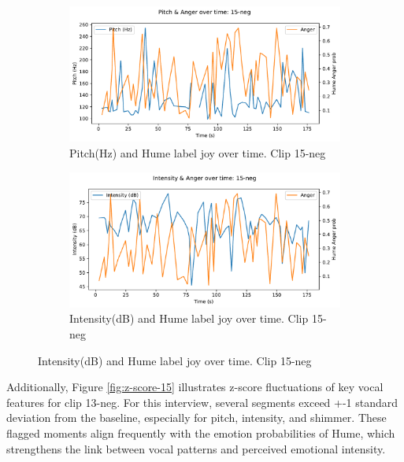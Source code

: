 \begin{figure}[H]
    \centering
    \begin{subfigure}[b]{0.47\textwidth}
        \includegraphics[width=\linewidth]{png/results/rq1/pitch_anger_15-neg.pdf}
        \caption{Pitch(Hz) and Hume label joy over time. Clip 15-neg}
        \label{fig:pitch-15-neg}
    \end{subfigure}
    \hspace{0.04\textwidth}
    \begin{subfigure}[b]{0.47\textwidth}
        \includegraphics[width=\linewidth]{png/results/rq1/intensity_anger_15-neg.pdf}
        \caption{Intensity(dB) and Hume label joy over time. Clip 15-neg}
        \label{fig:intensity-15-neg}
    \end{subfigure}
\end{figure}

Additionally, Figure \ref{fig:z-score-15} illustrates z-score fluctuations of key vocal features for clip 13-neg. For this interview, several segments exceed +-1 standard deviation from the baseline, especially for pitch, intensity, and shimmer. These flagged moments align frequently with the emotion probabilities of Hume, which strengthens the link between vocal patterns and perceived emotional intensity. 

